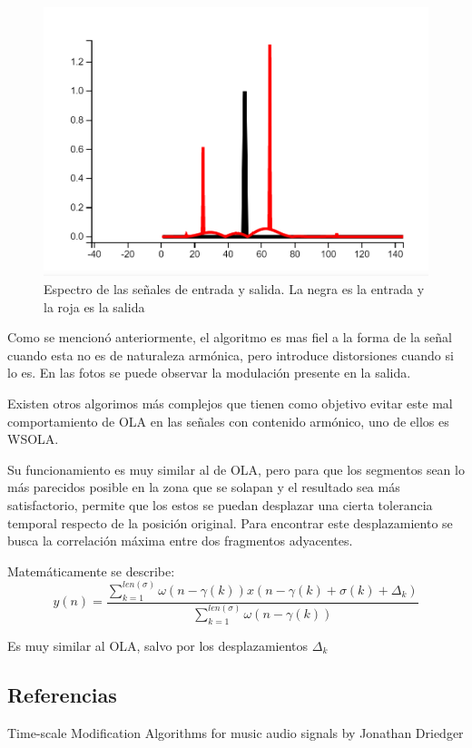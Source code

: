 \documentclass[assd_tp2_main.tex]{subfiles}
\begin{document}
\begin{figure}[H]	
	\centering
	\includegraphics[scale=0.5]{graficos/EJ6/senoespectro.png}
	\caption{Espectro de las señales de entrada y salida. La negra es la entrada y la roja es la salida}
\end{figure}

Como se mencionó anteriormente, el algoritmo es mas fiel a la forma de la señal cuando esta no es de naturaleza armónica, pero introduce distorsiones cuando si lo es. En las fotos se puede observar la modulación presente en la salida.

Existen otros algorimos más complejos que tienen como objetivo evitar este mal comportamiento de OLA en las señales con contenido armónico, uno de ellos es WSOLA.

Su funcionamiento es muy similar al de OLA, pero para que los segmentos sean lo más parecidos posible en la zona que se solapan y el resultado sea más satisfactorio, permite que los estos se puedan desplazar una cierta tolerancia temporal respecto de la posición original. Para encontrar este desplazamiento se busca la correlación máxima entre dos fragmentos adyacentes.

Matemáticamente se describe:
\begin{equation}
y(n)=\frac{\sum_{k=1}^{len(\sigma)} \omega(n - \gamma (k)) x(n-\gamma (k) + \sigma (k) + \Delta_{k})}{\sum_{k=1}^{len(\sigma)}\omega(n - \gamma (k))}
\end{equation}

Es muy similar al OLA, salvo por los desplazamientos $\Delta_{k}$

\subsection{Referencias}
Time-scale Modification Algorithms for music audio signals by Jonathan Driedger
\end{document}
